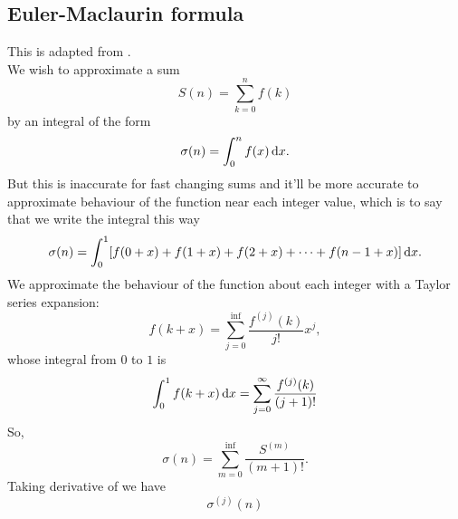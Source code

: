 \subsection{Euler-Maclaurin formula}
This is adapted from \cite{emform}. \\
We wish to approximate a sum 
\begin{equation}
S(n)=\sum^{n}_{k=0}f(k)
\end{equation}
by an integral of the form
\begin{equation}
\label{sigman}
\sigma(n)=\int^n_0 f(x)\dx. 
\end{equation}
But this is inaccurate for fast changing sums and it'll be more accurate to 
approximate behaviour of the function near each integer value, which is to say 
that we write the integral this way
\begin{equation}
\sigma(n)=\int^1_0[f(0+x)+f(1+x)+f(2+x)+\cdots+f(n-1+x)]\dx.
\end{equation}
We approximate the behaviour of the function about each integer with a Taylor 
series expansion:
\begin{equation}
f(k+x)=\sum^{\inf}_{j=0}\frac{f^{(j)}(k)}{j!}x^j, 
\end{equation}
whose integral from $0$ to $1$ is 
\begin{equation}
\int^1_0 f(k+x)\dx=\sum^{\inf}_{j=0} \frac{f^{(j)}(k)}{(j+1)!}
\end{equation}
So,
\begin{equation}
\label{sigman2}
\sigma(n)=\sum^{\inf}_{m=0}\frac{S^{(m)}}{(m+1)!}.
\end{equation}
Taking derivative of  we have 
\begin{equation}
\sigma^{(j)}(n)
\end{equation}

